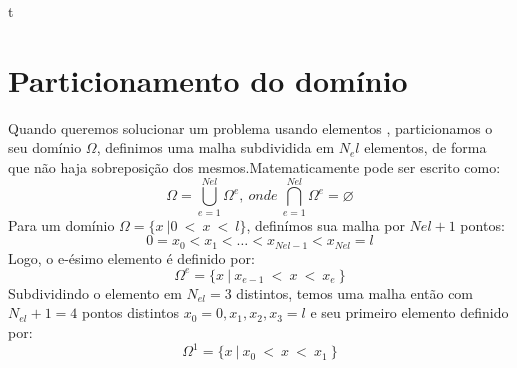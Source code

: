 t\section{Particionamento do domínio}
 Quando queremos solucionar um problema usando elementos , particionamos o seu domínio $\Omega$, definimos uma malha subdividida em $N_el$ elementos, de forma que não haja sobreposição dos mesmos.Matematicamente pode ser escrito como:\
\begin{equation}
 \Omega  = \bigcup^{Nel}_{e= 1} \Omega^e,\ onde\ \bigcap^{Nel}_{e= 1} \Omega^e = \varnothing
\end{equation}
Para um domínio $ \Omega = \{x\ | 0 \ <\ x\ <\ l  \}$, definímos sua malha por $Nel + 1$ pontos:
\begin{equation}
 0  = x_0 < x_1 < \ldots < x_{Nel - 1} < x_{Nel} = l
\end{equation}
Logo, o e-ésimo elemento é definido por:
\begin{equation}
 \Omega^e = \{x\ |\ x_{e-1}\ <\ x\ <\ x_{e}\ \}
\end{equation}
 Subdividindo o elemento em $N_{el} = 3$ distintos, temos uma malha então com $N_{el} + 1 = 4$ pontos distintos $x_0 =0,x_1,x_2,x_3=l$ e seu primeiro elemento definido por:
\begin{equation}
 \Omega^1 = \{x\ |\ x_{0}\ <\ x\ <\ x_{1}\ \}
\end{equation}



